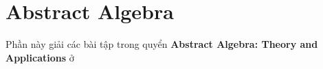 \chapter{Abstract Algebra}

Phần này giải các bài tập trong quyển \textbf{Abstract Algebra: Theory and Applications}
ở \cite{Judson} %




